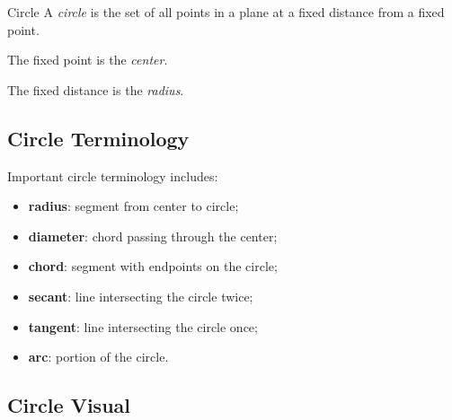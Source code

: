 \begin{definitionbox}{Circle}
A \emph{circle} is the set of all points in a plane at a fixed distance from
a fixed point.
\end{definitionbox}

The fixed point is the \emph{center}.

The fixed distance is the \emph{radius}.

\subsection{Circle Terminology}
\label{subsec:circle-terminology}

Important circle terminology includes:

\begin{itemize}
    \item \textbf{radius}: segment from center to circle;
    \item \textbf{diameter}: chord passing through the center;
    \item \textbf{chord}: segment with endpoints on the circle;
    \item \textbf{secant}: line intersecting the circle twice;
    \item \textbf{tangent}: line intersecting the circle once;
    \item \textbf{arc}: portion of the circle.
\end{itemize}

\subsection{Circle Visual}
\label{subsec:circle-visual}

\begin{centereddiagram}
\end{centereddiagram}

